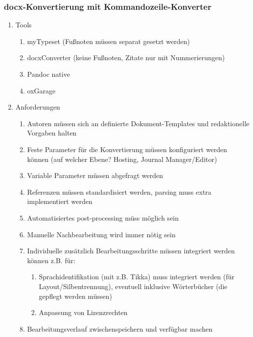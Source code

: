\documentclass{article}
\begin{document}
\subsubsection{docx-Konvertierung mit Kommandozeile-Konverter}
\begin{enumerate}
\item Tools
\begin{enumerate}
\item myTypeset (Fußnoten müssen separat gesetzt werden)
\item docxConverter (keine Fußnoten, Zitate nur mit Nummerierungen)
\item Pandoc native
\item oxGarage
\end{enumerate}
\item Anforderungen
\begin{enumerate}
\item Autoren müssen sich an definierte Dokument-Templates und redaktionelle Vorgaben halten
\item Feste Parameter für die Konvertierung müssen konfiguriert werden können (auf welcher Ebene? Hosting, Journal Manager/Editor)
\item Variable Parameter müssen abgefragt werden
\item Referenzen müssen standardisiert werden, parsing muss extra implementiert werden
\item Automatisiertes post-processing müss möglich sein
\item Manuelle Nachbearbeitung wird immer nötig sein
\item Individuelle zusätzlich Bearbeitungsschritte müssen integriert werden können z.B. für:
\begin{enumerate}
\item Sprachidentifikation (mit z.B. Tikka) muss integriert werden (für Layout/Silbentrennung), eventuell inklusive Wörterbücher (die gepflegt werden müssen)
\item Anpassung von Lizenzrechten
\end{enumerate}
\item Bearbeitungsverlauf zwischenspeichern und verfügbar machen
\end{enumerate}
\end{enumerate}
\end{document}

